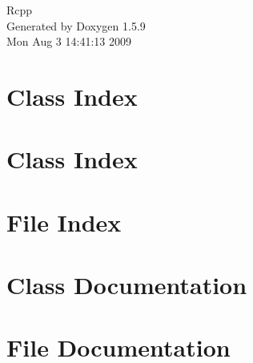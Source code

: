 \documentclass[a4paper]{book}
\begin{document}
\hypersetup{pageanchor=false}
\begin{titlepage}
\vspace*{7cm}
\begin{center}
{\Large Rcpp }\\
\vspace*{1cm}
{\large Generated by Doxygen 1.5.9}\\
\vspace*{0.5cm}
{\small Mon Aug 3 14:41:13 2009}\\
\end{center}
\end{titlepage}
\clearemptydoublepage
{}
\tableofcontents
\clearemptydoublepage
{}
\hypersetup{pageanchor=true}
\chapter{Class Index}

\chapter{Class Index}

\chapter{File Index}

\chapter{Class Documentation}


















\chapter{File Documentation}



\printindex
\end{document}
